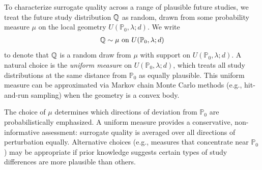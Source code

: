 \documentclass{article}
\newcommand{\PP}{\mathbb{P}}
\begin{document}
To characterize surrogate quality across a range of plausible future studies, we treat the future study distribution $\mathbb{Q}$ as random, drawn from some probability measure $\mu$ on the local geometry $U(\PP_0, \lambda; d)$. We write
\begin{align*}
    \Q \sim \mu \text{ on } U(\PP_0, \lambda; d)
\end{align*}
to denote that $\mathbb{Q}$ is a random draw from $\mu$ with support on $U(\PP_0, \lambda; d)$. A natural choice is the \emph{uniform measure} on $U(\PP_0, \lambda; d)$, which treats all study distributions at the same distance from $\PP_0$ as equally plausible. This uniform measure can be approximated via Markov chain Monte Carlo methods (e.g., hit-and-run sampling) when the geometry is a convex body.

The choice of $\mu$ determines which directions of deviation from $\PP_0$ are probabilistically emphasized. A uniform measure provides a conservative, non-informative assessment: surrogate quality is averaged over all directions of perturbation equally. Alternative choices (e.g., measures that concentrate near $\PP_0$) may be appropriate if prior knowledge suggests certain types of study differences are more plausible than others.
\end{document}
